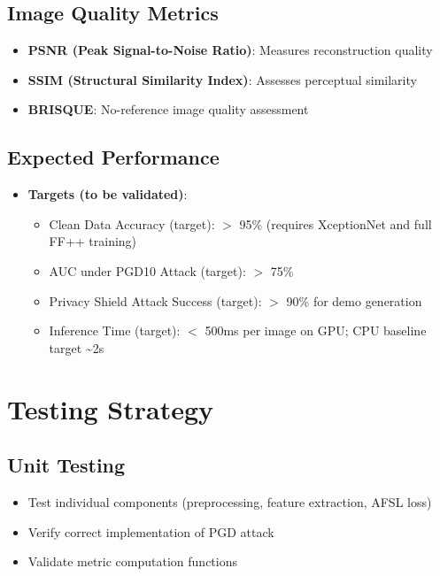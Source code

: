 \documentclass[a4paper,12pt]{article}
\begin{document}
\subsection{Image Quality Metrics}
\begin{itemize}
    \item \textbf{PSNR (Peak Signal-to-Noise Ratio)}: Measures reconstruction quality
    \item \textbf{SSIM (Structural Similarity Index)}: Assesses perceptual similarity
    \item \textbf{BRISQUE}: No-reference image quality assessment
\end{itemize}

\subsection{Expected Performance}
\begin{itemize}
    \item \textbf{Targets (to be validated)}:
    \begin{itemize}
        \item Clean Data Accuracy (target): $>$ 95\% (requires XceptionNet and full FF++ training)
        \item AUC under PGD10 Attack (target): $>$ 75\%
        \item Privacy Shield Attack Success (target): $>$ 90\% for demo generation
        \item Inference Time (target): $<$ 500ms per image on GPU; CPU baseline target \textasciitilde 2s
    \end{itemize}
\end{itemize}

\newpage
\section{Testing Strategy}

\subsection{Unit Testing}
\begin{itemize}
    \item Test individual components (preprocessing, feature extraction, AFSL loss)
    \item Verify correct implementation of PGD attack
    \item Validate metric computation functions
\end{itemize}
\end{document}
